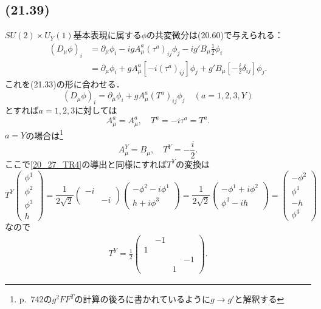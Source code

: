 \subsection{(21.39)}
\(SU(2) \times U_Y(1)\)基本表現に属する\(\phi\)の共変微分は(20.60)で与えられる：
\begin{align*}
  (D_\mu\phi)_i &= \partial_\mu\phi_i - igA^a_\mu (\tau^a)_{ij} \phi_j - i g' B_\mu \frac{1}{2} \phi_i \\
  &= \partial_\mu\phi_i + gA^a_\mu \left[-i(\tau^a)_{ij}\right] \phi_j + g' B_\mu \left[-\frac{i}{2}\delta_{ij}\right] \phi_j .
\end{align*}
これを(21.33)の形に合わせる．
\[ (D_\mu\phi)_i = \partial_\mu\phi_i + gA^a_\mu (T^a)_{ij} \phi_j \quad (a=1,2,3,Y) \]
とすれば\(a=1,2,3\)に対しては
\[ A^a_\mu = A^a_\mu , \quad T^a = -i \tau^a = T^a . \]
\(a=Y\)の場合は\footnote{p.~742の\(g^2FF^T\)の計算の後ろに書かれているように\(g \to g'\)と解釈する}
\[ A^Y_\mu = B_\mu , \quad T^Y = -\frac{i}{2} . \]
ここで\eqref{20_27_TR4}の導出と同様にすれば\(T^Y\)の変換は
\[
T^Y
\begin{pmatrix}
  \phi^1 \\ \phi^2 \\ \phi^3 \\ h
\end{pmatrix}
= \frac{1}{2\sqrt{2}}
\begin{pmatrix}
  -i & \\ & -i
\end{pmatrix}
\begin{pmatrix}
  -\phi^2 - i \phi^1 \\
  h + i\phi^3
\end{pmatrix}
= \frac{1}{2\sqrt{2}}
\begin{pmatrix}
  -\phi^1 + i \phi^2 \\
  \phi^3 - ih
\end{pmatrix}
=
\begin{pmatrix}
  -\phi^2 \\ \phi^1 \\ -h \\ \phi^3
\end{pmatrix}
\]
なので
\begin{align}
  T^Y = \frac{1}{2}
  \begin{pmatrix}
    & -1 & & \\ 1 & & & \\ & & & -1 \\ & & 1 &
  \end{pmatrix}
  . \label{21_39_TY}
\end{align}

